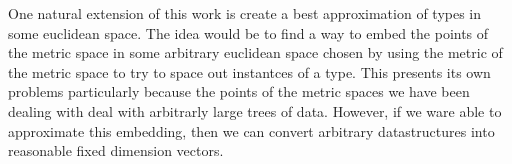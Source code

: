 One natural extension of this work is create a best approximation of types in some euclidean space.
The idea would be to find a way to embed the points of the metric space in some arbitrary euclidean space chosen 
by using the metric of the metric space to try to space out instantces of a type.
This presents its own problems particularly because the points of the metric spaces we have been dealing with 
deal with arbitrarly large trees of data.
However, if we ware able to approximate this embedding,
then we can convert arbitrary datastructures into reasonable fixed dimension vectors.